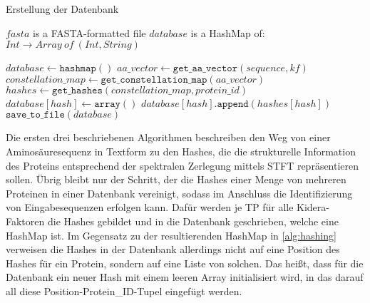         \begin{algorithm}[H]
            \caption{Erstellung der Datenbank}\label{alg:datenbank}
            \begin{algorithmic}
                \Require $fasta$ is a FASTA-formatted file
                \Ensure $database$ is a HashMap of: $Int \rightarrow Array\ of\ (Int, String)$

                \State $database \gets \texttt{hashmap}()$
                        \State $aa\_vector \gets \texttt{get\_aa\_vector}(sequence, kf)$
                        \State $constellation\_map \gets \texttt{get\_constellation\_map}(aa\_vector)$
                        \State $hashes \gets \texttt{get\_hashes}(constellation\_map, protein\_id)$
                                \State $database[hash] \gets \texttt{array}()$
                            \EndIf
                            \State $database[hash].\texttt{append}(hashes[hash])$
                        \EndFor
                    \EndFor
                \EndFor
                \State $\texttt{save\_to\_file}(database)$
            \end{algorithmic}
        \end{algorithm}

        Die ersten drei beschriebenen Algorithmen beschreiben den Weg von einer Aminosäuresequenz in Textform zu den Hashes, die die strukturelle Information des Proteins entsprechend der spektralen Zerlegung mittels \ac{STFT} repräsentieren sollen. Übrig bleibt nur der Schritt, der die Hashes einer Menge von mehreren Proteinen in einer Datenbank vereinigt, sodass im Anschluss die Identifizierung von Eingabesequenzen erfolgen kann. Dafür werden je \ac{TP} für alle Kidera-Faktoren die Hashes gebildet und in die Datenbank geschrieben, welche eine HashMap ist. Im Gegensatz zu der resultierenden HashMap in \autoref{alg:hashing} verweisen die Hashes in der Datenbank allerdings nicht auf eine Position des Hashes für ein Protein, sondern auf eine Liste von solchen. Das heißt, dass für die Datenbank ein neuer Hash mit einem leeren Array initialisiert wird, in das darauf all diese Position-Protein\_ID-Tupel eingefügt werden.

